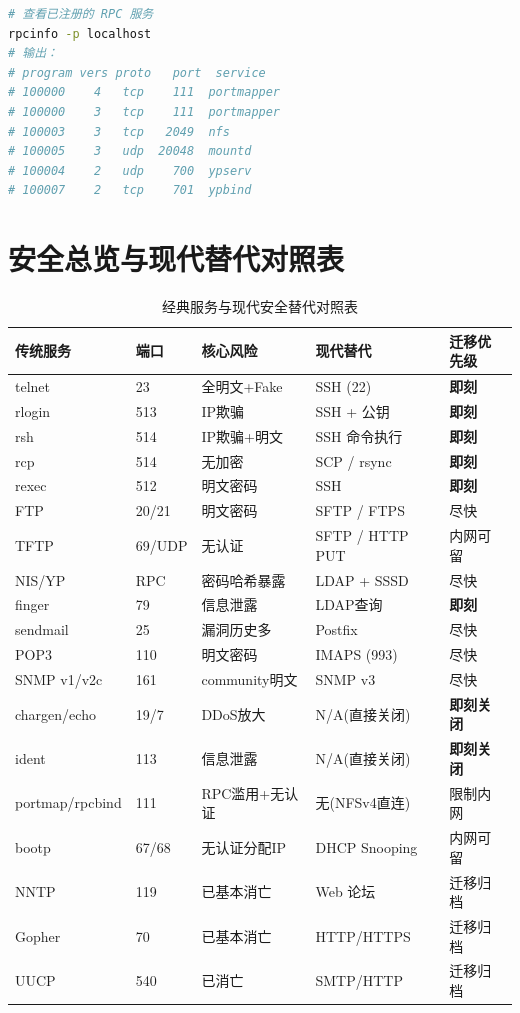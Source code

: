 \documentclass[12pt,UTF8]{ctexbook}
\begin{document}
\begin{lstlisting}[language=bash]
# 查看已注册的 RPC 服务
rpcinfo -p localhost
# 输出：
# program vers proto   port  service
# 100000    4   tcp    111  portmapper
# 100000    3   tcp    111  portmapper
# 100003    3   tcp   2049  nfs
# 100005    3   udp  20048  mountd
# 100004    2   udp    700  ypserv
# 100007    2   tcp    701  ypbind
\end{lstlisting}

\section{安全总览与现代替代对照表}
\label{sec:legacy-security-summary}

\begin{table}[h]
\centering
\caption{经典服务与现代安全替代对照表}
\begin{tabular}{|p{2.2cm}|p{1.5cm}|p{2.5cm}|p{2.8cm}|p{3cm}|}
\hline
\textbf{传统服务} & \textbf{端口} & \textbf{核心风险} & \textbf{现代替代} & \textbf{迁移优先级} \\
\hline
telnet & 23 & 全明文+Fake & SSH (22) & \textbf{即刻} \\
\hline
rlogin & 513 & IP欺骗 & SSH + 公钥 & \textbf{即刻} \\
\hline
rsh & 514 & IP欺骗+明文 & SSH 命令执行 & \textbf{即刻} \\
\hline
rcp & 514 & 无加密 & SCP / rsync & \textbf{即刻} \\
\hline
rexec & 512 & 明文密码 & SSH & \textbf{即刻} \\
\hline
FTP & 20/21 & 明文密码 & SFTP / FTPS & 尽快 \\
\hline
TFTP & 69/UDP & 无认证 & SFTP / HTTP PUT & 内网可留 \\
\hline
NIS/YP & RPC & 密码哈希暴露 & LDAP + SSSD & 尽快 \\
\hline
finger & 79 & 信息泄露 & LDAP查询 & \textbf{即刻} \\
\hline
sendmail & 25 & 漏洞历史多 & Postfix & 尽快 \\
\hline
POP3 & 110 & 明文密码 & IMAPS (993) & 尽快 \\
\hline
SNMP v1/v2c & 161 & community明文 & SNMP v3 & 尽快 \\
\hline
chargen/echo & 19/7 & DDoS放大 & N/A(直接关闭) & \textbf{即刻关闭} \\
\hline
ident & 113 & 信息泄露 & N/A(直接关闭) & \textbf{即刻关闭} \\
\hline
portmap/rpcbind & 111 & RPC滥用+无认证 & 无(NFSv4直连) & 限制内网 \\
\hline
bootp & 67/68 & 无认证分配IP & DHCP Snooping & 内网可留 \\
\hline
NNTP & 119 & 已基本消亡 & Web 论坛 & 迁移归档 \\
\hline
Gopher & 70 & 已基本消亡 & HTTP/HTTPS & 迁移归档 \\
\hline
UUCP & 540 & 已消亡 & SMTP/HTTP & 迁移归档 \\
\hline
\end{tabular}
\end{table}
\end{document}
